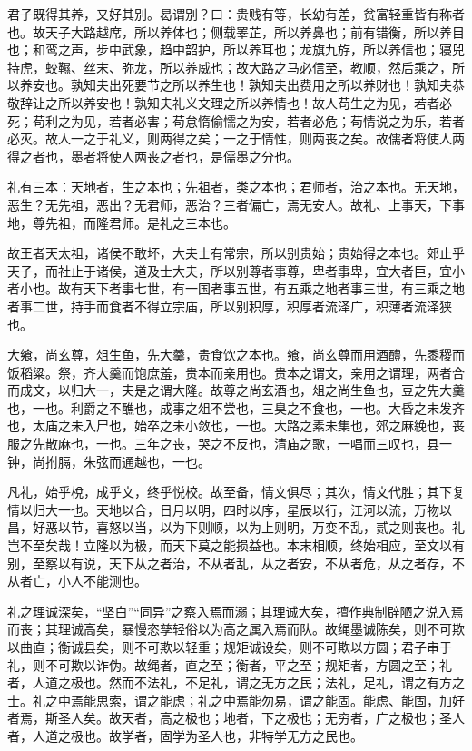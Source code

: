 \documentclass[]{article}
\begin{document}
君子既得其养，又好其别。曷谓别？曰：贵贱有等，长幼有差，贫富轻重皆有称者也。故天子大路越席，所以养体也；侧载睪芷，所以养鼻也；前有错衡，所以养目也；和鸾之声，步中武象，趋中韶护，所以养耳也；龙旗九斿，所以养信也；寝兕持虎，蛟韅、丝末、弥龙，所以养威也；故大路之马必信至，教顺，然后乘之，所以养安也。孰知夫出死要节之所以养生也！孰知夫出费用之所以养财也！孰知夫恭敬辞让之所以养安也！孰知夫礼义文理之所以养情也！故人苟生之为见，若者必死；苟利之为见，若者必害；苟怠惰偷懦之为安，若者必危；苟情说之为乐，若者必灭。故人一之于礼义，则两得之矣；一之于情性，则两丧之矣。故儒者将使人两得之者也，墨者将使人两丧之者也，是儒墨之分也。

礼有三本：天地者，生之本也；先祖者，类之本也；君师者，治之本也。无天地，恶生？无先祖，恶出？无君师，恶治？三者偏亡，焉无安人。故礼、上事天，下事地，尊先祖，而隆君师。是礼之三本也。

故王者天太祖，诸侯不敢坏，大夫士有常宗，所以别贵始；贵始得之本也。郊止乎天子，而社止于诸侯，道及士大夫，所以别尊者事尊，卑者事卑，宜大者巨，宜小者小也。故有天下者事七世，有一国者事五世，有五乘之地者事三世，有三乘之地者事二世，持手而食者不得立宗庙，所以别积厚，积厚者流泽广，积薄者流泽狭也。

大飨，尚玄尊，俎生鱼，先大羹，贵食饮之本也。飨，尚玄尊而用酒醴，先黍稷而饭稻粱。祭，齐大羹而饱庶羞，贵本而亲用也。贵本之谓文，亲用之谓理，两者合而成文，以归大一，夫是之谓大隆。故尊之尚玄酒也，俎之尚生鱼也，豆之先大羹也，一也。利爵之不醮也，成事之俎不尝也，三臭之不食也，一也。大昏之未发齐也，太庙之未入尸也，始卒之未小敛也，一也。大路之素未集也，郊之麻絻也，丧服之先散麻也，一也。三年之丧，哭之不反也，清庙之歌，一唱而三叹也，县一钟，尚拊膈，朱弦而通越也，一也。

凡礼，始乎梲，成乎文，终乎悦校。故至备，情文俱尽；其次，情文代胜；其下复情以归大一也。天地以合，日月以明，四时以序，星辰以行，江河以流，万物以昌，好恶以节，喜怒以当，以为下则顺，以为上则明，万变不乱，贰之则丧也。礼岂不至矣哉！立隆以为极，而天下莫之能损益也。本末相顺，终始相应，至文以有别，至察以有说，天下从之者治，不从者乱，从之者安，不从者危，从之者存，不从者亡，小人不能测也。

礼之理诚深矣，``坚白''``同异''之察入焉而溺；其理诚大矣，擅作典制辟陋之说入焉而丧；其理诚高矣，暴慢恣孳轻俗以为高之属入焉而队。故绳墨诚陈矣，则不可欺以曲直；衡诚县矣，则不可欺以轻重；规矩诚设矣，则不可欺以方圆；君子审于礼，则不可欺以诈伪。故绳者，直之至；衡者，平之至；规矩者，方圆之至；礼者，人道之极也。然而不法礼，不足礼，谓之无方之民；法礼，足礼，谓之有方之士。礼之中焉能思索，谓之能虑；礼之中焉能勿易，谓之能固。能虑、能固，加好者焉，斯圣人矣。故天者，高之极也；地者，下之极也；无穷者，广之极也；圣人者，人道之极也。故学者，固学为圣人也，非特学无方之民也。
\end{document}
